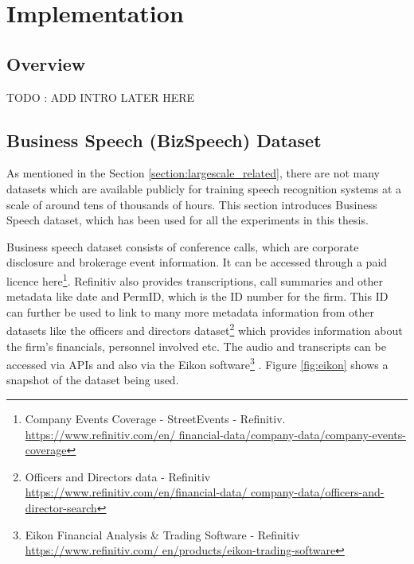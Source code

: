 \chapter{Implementation}
\label{chapter:methods}

\section{Overview}
TODO : ADD INTRO LATER HERE



\section{Business Speech (BizSpeech) Dataset}
As mentioned in the Section \ref{section:largescale_related}, there are not many datasets which are available publicly for training speech recognition systems at a scale of around tens of thousands of hours. This section introduces Business Speech dataset, which has been used for all the experiments in this thesis. 

Business speech dataset consists of conference calls, which are corporate disclosure and brokerage event information. It can be accessed through a paid licence here\footnote{Company Events Coverage - StreetEvents - Refinitiv. \href{https://www.refinitiv.com/en/financial-data/company-data/company-events-coverage}{https://www.refinitiv.com/en/ financial-data/company-data/company-events-coverage}}. Refinitiv also provides transcriptions, call summaries and other metadata like date and PermID, which is the ID number for the firm. This ID can further be used to link to many more metadata information from other datasets like the officers and directors dataset\footnote{Officers and Directors data - Refinitiv \href{https://www.refinitiv.com/en/financial-data/company-data/officers-and-director-search}{https://www.refinitiv.com/en/financial-data/ company-data/officers-and-director-search}} which provides information about the firm's financials, personnel involved etc. The audio and transcripts can be accessed via APIs and also via the Eikon software\footnote{Eikon Financial Analysis \& Trading Software - Refinitiv \href{https://www.refinitiv.com/en/products/eikon-trading-software}{https://www.refinitiv.com/ en/products/eikon-trading-software}} \cite{August2011ThomsonEikon}. Figure \ref{fig:eikon} shows a snapshot of the dataset being used.

